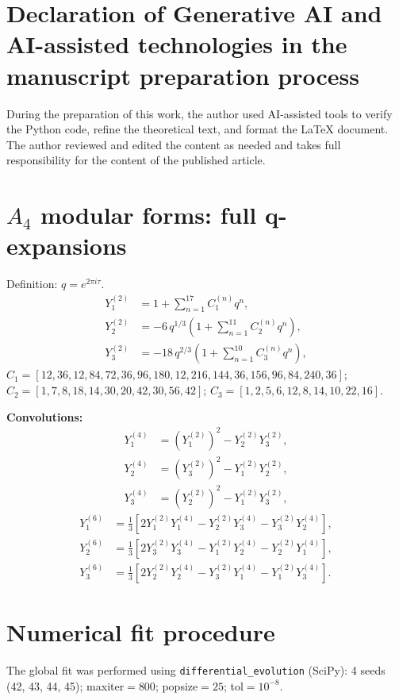 \documentclass[12pt,a4paper]{article}
\numberwithin{equation}{section}
\begin{document}
\section*{Declaration of Generative AI and AI-assisted technologies in the manuscript preparation process}
During the preparation of this work, the author used AI-assisted tools to verify the Python code, refine the theoretical text, and format the LaTeX document. The author reviewed and edited the content as needed and takes full responsibility for the content of the published article.

\appendix
\newpage

\section{\(A_4\) modular forms: full q-expansions}
Definition: \(q = e^{2\pi i\tau}\).
\begin{align}
Y_1^{(2)} &= 1 + \sum_{n=1}^{17} C_1^{(n)} q^n, \\
Y_2^{(2)} &= -6\, q^{1/3}\left(1 + \sum_{n=1}^{11} C_2^{(n)} q^n\right), \\
Y_3^{(2)} &= -18\, q^{2/3}\left(1 + \sum_{n=1}^{10} C_3^{(n)} q^n\right),
\end{align}
\(C_1 = [12, 36, 12, 84, 72, 36, 96, 180, 12, 216, 144, 36, 156, 96, 84, 240, 36]\);
\(C_2 = [1, 7, 8, 18, 14, 30, 20, 42, 30, 56, 42]\);
\(C_3 = [1, 2, 5, 6, 12, 8, 14, 10, 22, 16]\).

\textbf{Convolutions:}
\begin{align}
Y_1^{(4)} &= (Y_1^{(2)})^2 - Y_2^{(2)} Y_3^{(2)}, \\
Y_2^{(4)} &= (Y_3^{(2)})^2 - Y_1^{(2)} Y_2^{(2)}, \\
Y_3^{(4)} &= (Y_2^{(2)})^2 - Y_1^{(2)} Y_3^{(2)},
\end{align}
\begin{align}
Y_1^{(6)} &= \tfrac13\left[2 Y_1^{(2)} Y_1^{(4)} - Y_2^{(2)} Y_3^{(4)} - Y_3^{(2)} Y_2^{(4)}\right], \\
Y_2^{(6)} &= \tfrac13\left[2 Y_3^{(2)} Y_3^{(4)} - Y_1^{(2)} Y_2^{(4)} - Y_2^{(2)} Y_1^{(4)}\right], \\
Y_3^{(6)} &= \tfrac13\left[2 Y_2^{(2)} Y_2^{(4)} - Y_3^{(2)} Y_1^{(4)} - Y_1^{(2)} Y_3^{(4)}\right].
\end{align}

\section{Numerical fit procedure}
The global fit was performed using \texttt{differential\_evolution} (SciPy):
4 seeds (42, 43, 44, 45); maxiter$=800$; popsize$=25$; tol$=10^{-8}$.
\end{document}
